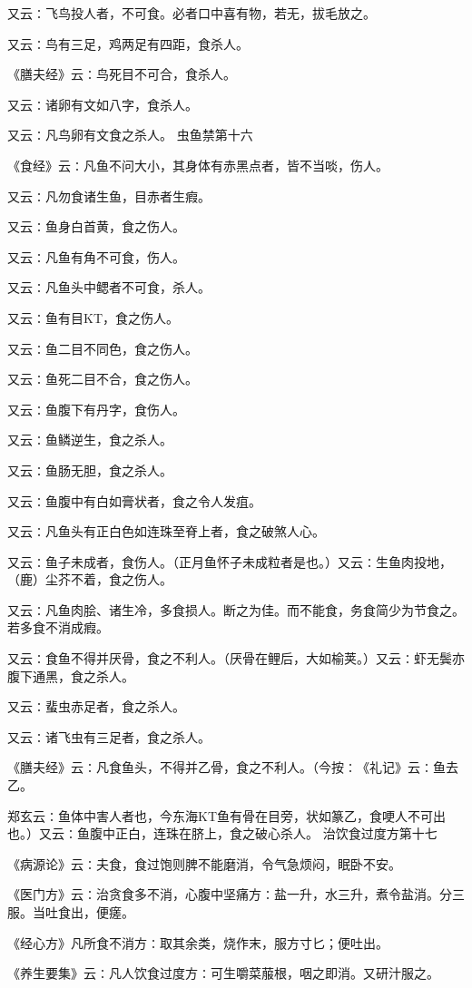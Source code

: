 \documentclass[a4paper,12pt,UTF8,twoside]{ctexbook}
\begin{document}
又云∶飞鸟投人者，不可食。必者口中喜有物，若无，拔毛放之。

又云∶鸟有三足，鸡两足有四距，食杀人。

《膳夫经》云∶鸟死目不可合，食杀人。

又云∶诸卵有文如八字，食杀人。

又云∶凡鸟卵有文食之杀人。
虫鱼禁第十六

《食经》云∶凡鱼不问大小，其身体有赤黑点者，皆不当啖，伤人。

又云∶凡勿食诸生鱼，目赤者生瘕。

又云∶鱼身白首黄，食之伤人。

又云∶凡鱼有角不可食，伤人。

又云∶凡鱼头中鳃者不可食，杀人。

又云∶鱼有目KT，食之伤人。

又云∶鱼二目不同色，食之伤人。

又云∶鱼死二目不合，食之伤人。

又云∶鱼腹下有丹字，食伤人。

又云∶鱼鳞逆生，食之杀人。

又云∶鱼肠无胆，食之杀人。

又云∶鱼腹中有白如膏状者，食之令人发疽。

又云∶凡鱼头有正白色如连珠至脊上者，食之破煞人心。

又云∶鱼子未成者，食伤人。（正月鱼怀子未成粒者是也。）又云∶生鱼肉投地，（鹿）尘芥不着，食之伤人。

又云∶凡鱼肉脍、诸生冷，多食损人。断之为佳。而不能食，务食简少为节食之。若多食不消成瘕。

又云∶食鱼不得并厌骨，食之不利人。（厌骨在鲤后，大如榆荚。）又云∶虾无鬓亦腹下通黑，食之杀人。

又云∶蜚虫赤足者，食之杀人。

又云∶诸飞虫有三足者，食之杀人。

《膳夫经》云∶凡食鱼头，不得并乙骨，食之不利人。（今按∶《礼记》云∶鱼去乙。

郑玄云∶鱼体中害人者也，今东海KT鱼有骨在目旁，状如篆乙，食哽人不可出也。）又云∶鱼腹中正白，连珠在脐上，食之破心杀人。
治饮食过度方第十七

《病源论》云∶夫食，食过饱则脾不能磨消，令气急烦闷，眠卧不安。

《医门方》云∶治贪食多不消，心腹中坚痛方∶盐一升，水三升，煮令盐消。分三服。当吐食出，便瘥。

《经心方》凡所食不消方∶取其余类，烧作末，服方寸匕；便吐出。

《养生要集》云∶凡人饮食过度方∶可生嚼菜菔根，咽之即消。又研汁服之。
\end{document}
